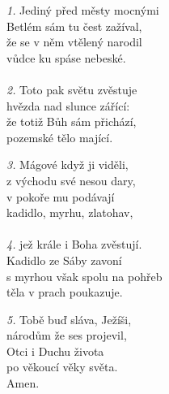 \begin{translatioMulticol}{3}
{\color{red}\textit{1.}} Jediný před městy mocnými\\
Betlém sám tu čest zažíval,\\
že se v něm vtělený narodil\\
vůdce ku spáse nebeské.\\
\\
{\color{red}\textit{2.}} Toto pak světu zvěstuje\\
hvězda nad slunce zářící:\\
že totiž Bůh sám přichází,\\
pozemské tělo mající.\columnbreak

{\color{red}\textit{3.}} Mágové když ji viděli,\\
z východu své nesou dary,\\
v pokoře mu podávají\\
kadidlo, myrhu, zlatohav,\\
\\
{\color{red}\textit{4.}} jež krále i Boha zvěstují.\\
Kadidlo ze Sáby zavoní\\
s myrhou však spolu na pohřeb\\
těla v prach poukazuje.\columnbreak

{\color{red}\textit{5.}} Tobě buď sláva, Ježíši,\\
národům že ses projevil,\\
Otci i Duchu života\\
po věkoucí věky světa.\\
Amen.
\end{translatioMulticol}
